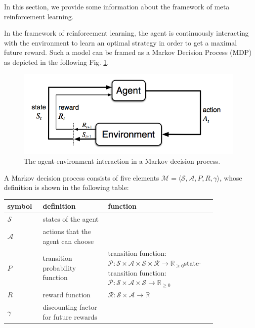 In this section, we provide some information about the framework of meta reinforcement learning.

\par
In the framework of reinforcement learning, the agent is continuously interacting with the environment to learn an optimal strategy in order to get a maximal future reward. Such a model can be framed as a Markov Decision Process (MDP) as depicted in the following Fig. \ref{mdp}.

\begin{figure}
	\includegraphics[scale=0.3]{mdp.png}
	\centering
	\caption{The agent-environment interaction in a Markov decision process\cite{n-step-return}.}
	\label{mdp}
\end{figure}

A Markov decision process consists of five elements $\mathcal{M} = \langle \mathcal{S}, \mathcal{A}, P, R, \gamma \rangle$, whose definition is shown in the following table:

\begin{center}
	\begin{tabular}{| p{0.12\linewidth} | p{0.27\linewidth} | p{0.45\linewidth} |}
		\hline
		\textbf{symbol} & \textbf{definition} & \textbf{function} \\
		\hline
		$\mathcal{S}$ & states of the agent &  \\ 
		\hline
		$\mathcal{A}$ & actions that the agent can choose &  \\ 
		\hline 
		$P$ & transition probability function & transition function:\newline $\mathcal{P}: \mathcal{S} \times \mathcal{A} \times \mathcal{S} \times \mathcal{R} \rightarrow \mathbb{R}_{\geq 0}$\newline state-transition function:\newline $\mathcal{P}: \mathcal{S} \times \mathcal{A} \times \mathcal{S} \rightarrow \mathbb{R}_{\geq 0}$\\
		\hline 
		$R$ & reward function & $\mathcal{R}: \mathcal{S} \times \mathcal{A} \rightarrow \mathbb{R}$ \\
		\hline 
		$\gamma$ & discounting factor for future rewards &  \\
		\hline 
	\end{tabular}
\end{center}

